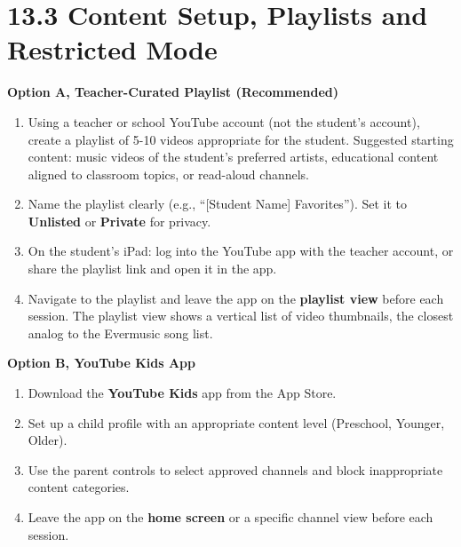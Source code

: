 \documentclass[justified,openright]{tufte-book}
\begin{document}
\section{13.3 Content Setup, Playlists and Restricted
Mode}\label{youtube-content-setup}


\textbf{Option A, Teacher-Curated Playlist (Recommended)}

\begin{enumerate}
\item
  Using a teacher or school YouTube account (not the student's account),
  create a playlist of 5-10 videos appropriate for the student.
  Suggested starting content: music videos of the student's preferred
  artists, educational content aligned to classroom topics, or
  read-aloud channels.
\item
  Name the playlist clearly (e.g., ``[Student Name] Favorites'').
  Set it to \textbf{Unlisted} or \textbf{Private} for privacy.
\item
  On the student's iPad: log into the YouTube app with the teacher
  account, or share the playlist link and open it in the app.
\item
  Navigate to the playlist and leave the app on the \textbf{playlist
  view} before each session. The playlist view shows a vertical list of
  video thumbnails, the closest analog to the Evermusic song list.
\end{enumerate}

\textbf{Option B, YouTube Kids App}

\begin{enumerate}
\item
  Download the \textbf{YouTube Kids} app from the App Store.
\item
  Set up a child profile with an appropriate content level
  (Preschool, Younger, Older).
\item
  Use the parent controls to select approved channels and block
  inappropriate content categories.
\item
  Leave the app on the \textbf{home screen} or a specific channel
  view before each session.
\end{enumerate}
\end{document}
